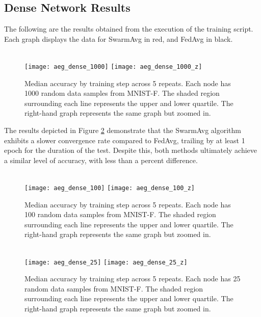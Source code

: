 \subsection{Dense Network Results}
The following are the results obtained from the execution of the training script. Each graph displays the data for SwarmAvg in red, and FedAvg in black.

\begin{figure}[H] 
	 \\
	\texttt{[image: aeg\_dense\_1000]}
	\texttt{[image: aeg\_dense\_1000\_z]}
	\caption{Median accuracy by training step across 5 repeats. Each node has 1000 random data samples from MNIST-F. The shaded region surrounding each line represents the upper and lower quartile. The right-hand graph represents the same graph but zoomed in.}
	\label{aeg1}
\end{figure}

The results depicted in Figure \ref{aeg2} demonstrate that the SwarmAvg algorithm exhibits a slower convergence rate compared to FedAvg, trailing by at least 1 epoch for the duration of the test. Despite this, both methods ultimately achieve a similar level of accuracy, with less than a percent difference.

\begin{figure}[H] 
	 \\
	\texttt{[image: aeg\_dense\_100]}
	\texttt{[image: aeg\_dense\_100\_z]}
	\caption{Median accuracy by training step across 5 repeats. Each node has 100 random data samples from MNIST-F. The shaded region surrounding each line represents the upper and lower quartile. The right-hand graph represents the same graph but zoomed in.}
	\label{aeg2}
\end{figure}



\begin{figure}[H] 
	 \\
	\texttt{[image: aeg\_dense\_25]}
	\texttt{[image: aeg\_dense\_25\_z]}
	\caption{Median accuracy by training step across 5 repeats. Each node has 25 random data samples from MNIST-F. The shaded region surrounding each line represents the upper and lower quartile. The right-hand graph represents the same graph but zoomed in.}
	\label{aeg3}
\end{figure}

